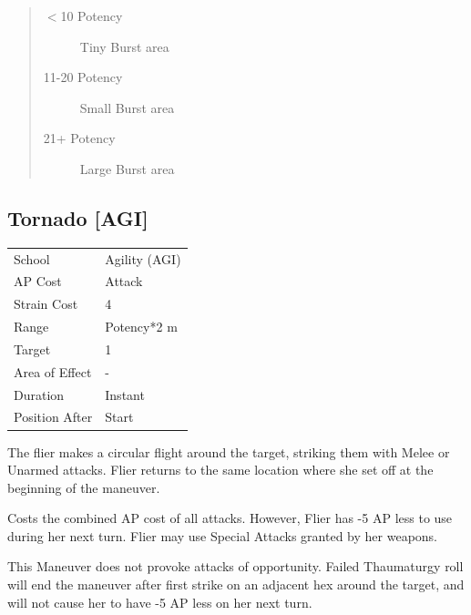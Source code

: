 \documentclass[11pt,a4paper,twocolumn]{book}
\begin{document}
\begin{quote}
  \begin{description}
    \item[$<$10 Potency] 	Tiny Burst area
    \item[11-20 Potency] 	Small Burst area
    \item[21+ Potency] 	Large Burst area
  \end{description}
\end{quote}

\vfill

\subsection*{Tornado [AGI]}
{
	\begin{tabu} to 75mm{| X[l,4] | X[l,7] |}
		\hline
		School 			& Agility (AGI) 	\\
        AP Cost	      	& Attack	 		\\
        Strain Cost     & 4 				\\
        Range     		& Potency*2 m 		\\
        Target      	& 1 				\\
        Area of Effect  & - 	 			\\
        Duration     	& Instant 	 		\\
		Position After  & Start 			\\ \hline
	\end{tabu}
		
}

\medskip

The flier makes a circular flight around the target, striking them with Melee or Unarmed attacks. Flier returns to the same location where she set off at the beginning of the maneuver.

Costs the combined AP cost of all attacks. However, Flier has -5 AP less to use during her next turn. Flier may use Special Attacks granted by her weapons.

This Maneuver does not provoke attacks of opportunity. Failed Thaumaturgy roll will end the maneuver after first strike on an adjacent hex around the target, and will not cause her to have -5 AP less on her next turn.
\end{document}
